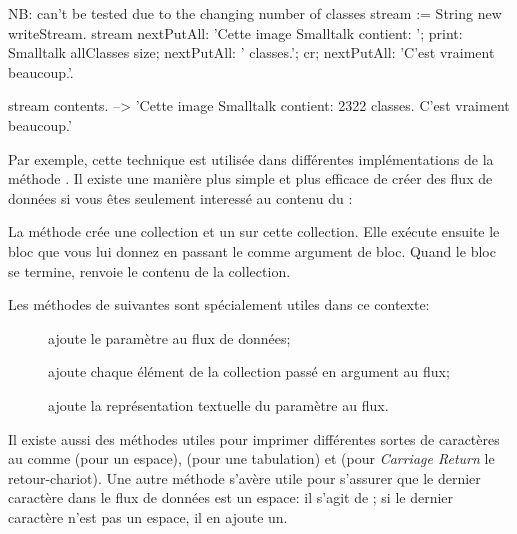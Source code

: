 \documentclass[a4paper,10pt,twoside]{book}
\begin{document}
\begin{code}{NB: can't be tested due to the changing number of classes}
stream := String new writeStream.
stream
  nextPutAll: 'Cette image Smalltalk contient: ';
  print: Smalltalk allClasses size;
  nextPutAll: ' classes.';
  cr;
  nextPutAll: 'C'est vraiment beaucoup.'.

stream contents. --> 'Cette image Smalltalk contient: 2322 classes. C'est vraiment beaucoup.'
\end{code}

Par exemple, cette technique est utilisée dans différentes 
implémentations de la méthode . Il existe une manière
plus simple et plus efficace de créer des flux de données si vous êtes
seulement interessé au contenu du \stream:


La méthode   crée une collection et un \stream sur cette collection.
Elle exécute ensuite le bloc que vous lui donnez en passant le \stream comme argument de bloc. Quand le bloc se termine, 
renvoie le contenu de la collection.

Les méthodes de  suivantes sont spécialement utiles dans ce contexte:

\begin{description}
\item[] ajoute le paramètre au flux de données;
\item[] ajoute chaque élément de la collection passé en argument au flux;
\item[] ajoute la représentation textuelle du paramètre au flux.
\end{description}

Il existe aussi des méthodes utiles pour imprimer différentes sortes
de caractères au \stream comme  (pour un espace), 
    (pour une tabulation) et
    (pour \emph{Carriage Return} \cad le retour-chariot).
Une autre méthode s'avère utile pour s'assurer que le dernier caractère
dans le flux de données est un espace: il s'agit de ; si le dernier caractère n'est pas un espace, il en ajoute un.
\end{document}
